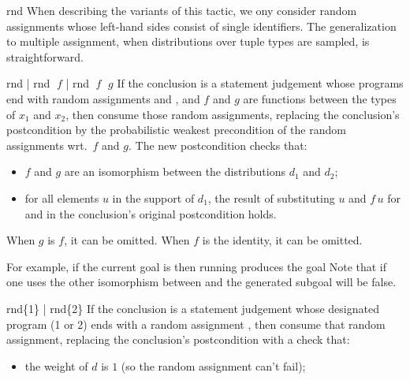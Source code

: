 \begin{tactic}{rnd}
  When describing the variants of this tactic, we ony consider random
  assignments whose left-hand sides consist of single identifiers.
  The generalization to multiple assignment, when distributions over
  tuple types are sampled, is straightforward.

  \bigskip
  \begin{tsyntax}{rnd | rnd $\;f$ | rnd $\;f$ $\;g$} If the conclusion
    is a \prhl statement judgement whose programs end with random
    assignments  and , and $f$ and $g$ are functions between the types of
    $x_1$ and $x_2$, then consume those random assignments, replacing
    the conclusion's postcondition by the probabilistic weakest
    precondition of the random assignments wrt.\ $f$ and $g$.  The new
    postcondition checks that:
    \begin{itemize}
    \item $f$ and $g$ are an isomorphism between the distributions
      $d_1$ and $d_2$;

    \item for all elements $u$ in the support of $d_1$, the result
      of substituting $u$ and $f\,u$ for  and
       in the conclusion's original postcondition
      holds.
    \end{itemize}
    When $g$ is $f$, it can be omitted. When $f$ is the identity, it
    can be omitted.

    \bigskip For example, if the current goal is
     then
    running 
    produces the goal
    Note that if one uses the other isomorphism between  and
    \ec{[2..3]} the generated subgoal will be false.
  \end{tsyntax}

  \begin{tsyntax}{rnd\{1\} | rnd\{2\}}
    If the conclusion is a \prhl statement judgement whose designated
    program (1 or 2) ends with a random assignment 
    , then consume that random assignment,
    replacing the conclusion's postcondition with a check that:
    \begin{itemize}
    \item the weight of $d$ is $1$ (so the random assignment can't fail);


\end{itemize}
\end{tsyntax}
\end{tactic}
